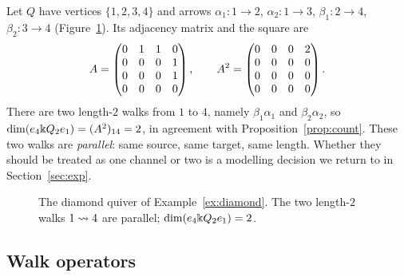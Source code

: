 \begin{example}\label{ex:diamond}
Let $Q$ have vertices $\{1,2,3,4\}$ and arrows
$\alpha_1\colon 1\to2$, $\alpha_2\colon 1\to3$, $\beta_1\colon 2\to4$,
$\beta_2\colon 3\to4$ (Figure~\ref{fig:diamond}). Its adjacency matrix and the
square are
\[
  A=\begin{pmatrix}0&1&1&0\\0&0&0&1\\0&0&0&1\\0&0&0&0\end{pmatrix},
  \qquad
  A^2=\begin{pmatrix}0&0&0&2\\0&0&0&0\\0&0&0&0\\0&0&0&0\end{pmatrix}.
\]
There are two length-$2$ walks from $1$ to $4$, namely
$\beta_1\alpha_1$ and $\beta_2\alpha_2$, so
$\dim(e_4\Bbbk Q_2 e_1)=(A^2)_{14}=2$, in agreement with
Proposition~\ref{prop:count}. These two walks are \emph{parallel}: same source,
same target, same length. Whether they should be treated as one channel or two is
a modelling decision we return to in Section~\ref{sec:exp}.
\end{example}

\begin{figure}[t]
\centering
{}
\caption{The diamond quiver of Example~\ref{ex:diamond}. The two length-$2$ walks
$1\rightsquigarrow 4$ are parallel; $\dim(e_4\Bbbk Q_2 e_1)=2$.}
\label{fig:diamond}
\end{figure}

\subsection{Walk operators}

